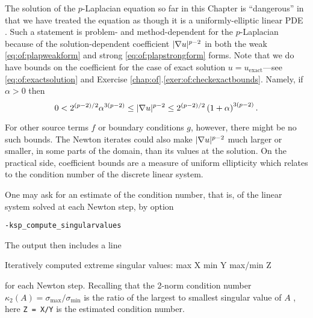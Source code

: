 The solution of the $p$-Laplacian equation so far in this Chapter is ``dangerous'' in that we have treated the equation as though it is a uniformly-elliptic linear PDE \citep{Evans2010}.  Such a statement is problem- and method-dependent for the $p$-Laplacian because of the solution-dependent coefficient $|\nabla u|^{p-2}$ in both the weak \eqref{eq:of:plapweakform} and strong \eqref{eq:of:plapstrongform} forms.  Note that we do have bounds on the coefficient for the case of exact solution $u=u_{\text{exact}}$---see \eqref{eq:of:exactsolution} and Exercise \ref{chap:of}.\ref{exer:of:checkexactbounds}.  Namely, if $\alpha>0$ then
\begin{equation}
0 < 2^{(p-2)/2} \alpha^{3(p-2)} \le |\nabla u|^{p-2} \le 2^{(p-2)/2} \left(1+\alpha\right)^{3(p-2)}.  \label{eq:of:coeffbounds}
\end{equation}

For other source terms $f$ or boundary conditions $g$, however, there might be no such bounds.  The Newton iterates could also make $|\nabla u|^{p-2}$ much larger or smaller, in some parts of the domain, than its values at the solution.  On the practical side, coefficient bounds are a measure of uniform ellipticity which relates to the condition number of the discrete linear system.

One may ask \PETSc for an estimate of the condition number, that is, of the linear system solved at each Newton step, by option

\centerline{\texttt{-ksp\_compute\_singularvalues}}

\noindent The output then includes a line
\begin{code}
Iteratively computed extreme singular values: max X min Y max/min Z
\end{code}
for each Newton step.  Recalling that the 2-norm condition number $\kappa_2(A)=\sigma_{\text{max}}/\sigma_{\text{min}}$ is the ratio of the largest to smallest singular value of $A$ \citep{TrefethenBau1997}, here \texttt{Z = X/Y} is the estimated condition number.


